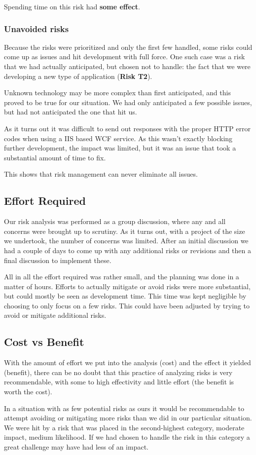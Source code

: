 Spending time on this risk had \textbf{some effect}.

\subsubsection{Unavoided risks}

Because the risks were prioritized and only the first few handled, some risks could come up as issues and
hit development with full force. One such case was a risk that we had actually anticipated, but chosen
not to handle: the fact that we were developing a new type of application (\textbf{Risk T2}).

Unknown technology may be more complex than first anticipated, and this proved to be true for our situation.
We had only anticipated a few possible issues, but had not anticipated the one that hit us.

As it turns out it was difficult to send out responses with the proper HTTP error codes when using a IIS based
WCF service. As this wasn't exactly blocking further development, the impact was limited, but it was an issue
that took a substantial amount of time to fix.

This shows that risk management can never eliminate all issues.

\subsection{Effort Required}

Our risk analysis was performed as a group discussion, where any and all concerns were brought up to scrutiny.
As it turns out, with a project of the size we undertook, the number of concerns was limited. After an initial
discussion we had a couple of days to come up with any additional risks or revisions and then a final discussion
to implement these.

All in all the effort required was rather small, and the planning was done in a matter of hours. Efforts to actually
mitigate or avoid risks were more substantial, but could mostly be seen as development time. This time was kept
negligible by choosing to only focus on a few risks. This could have been adjusted by trying to avoid or mitigate
additional risks.

\subsection{Cost vs Benefit}

With the amount of effort we put into the analysis (cost) and the effect it yielded (benefit), there can be no doubt
that this practice of analyzing risks is very recommendable, with some to high effectivity and little effort (the
benefit is worth the cost).

In a situation with as few potential risks as ours it would be recommendable to attempt avoiding or mitigating more
risks than we did in our particular situation. We were hit by a risk that was placed in the second-highest category,
moderate impact, medium likelihood. If we had chosen to handle the risk in this category a great challenge may have
had less of an impact.
